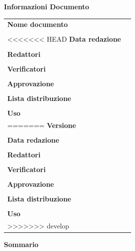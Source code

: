 \begin{center}
\vspace{1cm}
	\textbf{\Large Informazioni Documento} \\[10pt]
	\begin{longtable}{l|p{150pt}}
		\textbf{Nome documento} & \documentName \\ & \\
<<<<<<< HEAD
		\textbf{Data redazione} & \documentDate \\ & \\
		\textbf{Redattori} & \parbox[t]{\linewidth}{\documentEditors} \\ & \\
		\textbf{Verificatori} & \parbox{\linewidth}{\documentVerifiers} \\ & \\
		\textbf{Approvazione} & \parbox{\linewidth}{\documentApprovers} \\ & \\
		\textbf{Lista distribuzione} & \parbox{\linewidth}{\documentDistributionList} \\ & \\
		\textbf{Uso} & \parbox{\linewidth}{\documentUsage} \\
=======
		\textbf{Versione} & \documentVersion \\ & \\
		\textbf{Data redazione} & \documentDate \\ & \\
		\textbf{Redattori} & \parbox[t]{\textwidth}{\documentEditors} \\ & \\
		\textbf{Verificatori} & \parbox{\textwidth}{\documentVerifiers} \\ & \\
		\textbf{Approvazione} & \parbox{\textwidth}{\documentApprovers} \\ & \\
		\textbf{Lista distribuzione} & \parbox{\textwidth}{\documentDistributionList} \\ & \\
		\textbf{Uso} & \parbox{\textwidth}{\documentUsage} \\
>>>>>>> develop
	\end{longtable}
	\vspace{10pt}
	\textbf{\Large Sommario} \\
\end{center}
\documentSummary